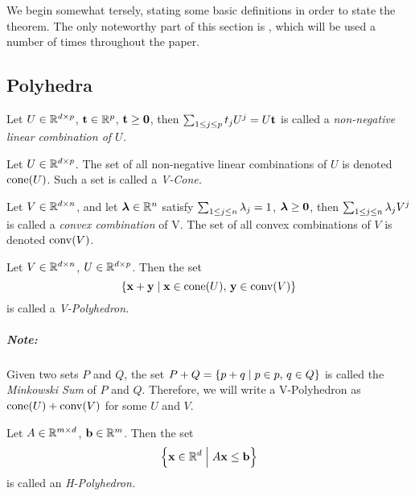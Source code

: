 \chapter{\MWT}

We begin somewhat tersely, stating some basic definitions in order to state the theorem.  The only noteworthy part of this section is , which will be used a number of times throughout the paper.

\section{Polyhedra}

\begin{Def}{
		Let $U \in \mathbb{R}^{d\times p}$, $\mathbf{t} \in \mathbb{R}^{p}$, ${\mathbf{t} \geq \mathbf{0}}$, then \( \sum_{1\leq j \leq p}t_j U^j = U\mathbf{t}\) is called a \em{non-negative linear combination} of $U$.
	}\end{Def}

\begin{Def}[V-Cone]{
		Let $U \in \mathbb{R}^{d\times p}$.  The set of all non-negative linear combinations of $U$ is denoted $\operatorname{cone}(U)$.  Such a set is called a \em{V-Cone}.
	}\end{Def}

\begin{Def}{
		Let $V \in \mathbb{R}^{d\times n}$, and let $\bm{\lambda} \in \mathbb{R}^{n}$ satisfy $\sum_{1\leq j \leq n}\lambda_j = 1$, $\bm{\lambda} \geq\mathbf{0}$, then \( \sum_{1\leq j \leq n}\lambda_j V^j \) is called a \textit{convex combination} of V.  The set of all convex combinations of $V$ is denoted $\operatorname{conv}(V)$.
	}\end{Def}

\begin{Def}[V-Polyhedron]{
		Let $V \in \mathbb{R}^{d\times n}$, $U \in \mathbb{R}^{d\times p}$.  Then the set
		\[ \left\{\mathbf{x} + \mathbf{y} \;|\; \mathbf{x} \in \operatorname{cone}(U),\, \mathbf{y} \in \operatorname{conv}(V)\right\} \]
		is called a \em{V-Polyhedron}.
	}\end{Def}

\paragraph{Note:} Given two sets $P$ and $Q$, the set $P+Q = \left\{p+q\;|\; p\in p,\,q\in Q\right\}$ is called the \textit{Minkowski Sum} of $P$ and $Q$.  Therefore, we will write a V-Polyhedron as $\operatorname{cone}(U) + \operatorname{conv}(V)$ for some $U$ and $V$.\\

\begin{Def}[H-Polyhedron]{
		Let $A \in \mathbb{R}^{{m}\times d}$, $\mathbf{b} \in \mathbb{R}^{m}$.  Then the set
		\[ \left\{\mathbf{x} \in \mathbb{R}^d \;\Big|\; A\mathbf{x} \leq \mathbf{b}\right\} \]
		is called an \em{H-Polyhedron}.
	}\end{Def}

